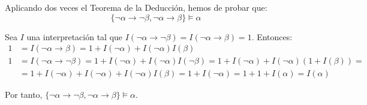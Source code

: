 \begin{ejercicio}
\begin{enumerate}
        Aplicando dos veces el Teorema de la Deducción, hemos de probar que:
        \begin{equation*}
            \{\neg\alpha\rightarrow\neg\beta,\neg\alpha\rightarrow\beta\} \models \alpha
        \end{equation*}

        Sea $I$ una interpretación tal que $I(\neg\alpha\rightarrow\neg\beta) = I(\neg\alpha\rightarrow\beta) = 1$. Entonces:
        \begin{align*}
            1&=I(\neg\alpha\rightarrow\beta) = 1+I(\neg\alpha)+I(\neg\alpha)I(\beta)\\
            1&=I(\neg\alpha\rightarrow\neg\beta) = 1+I(\neg\alpha)+I(\neg\alpha)I(\neg\beta) = 1+I(\neg\alpha)+I(\neg\alpha)\left(1+I(\beta)\right)
            =\\&= 1+I(\neg\alpha)+I(\neg\alpha)+I(\neg\alpha)I(\beta)=1+I(\neg\alpha)=1+1+I(\alpha)=I(\alpha)
        \end{align*}

        Por tanto, $\{\neg\alpha\rightarrow\neg\beta,\neg\alpha\rightarrow\beta\} \models \alpha$.
    \end{enumerate}
\end{ejercicio}

